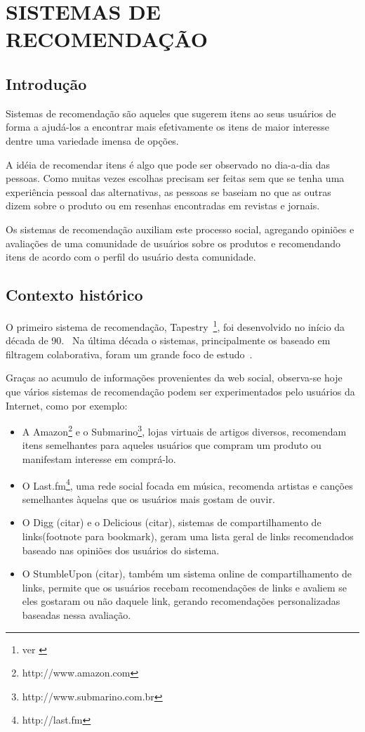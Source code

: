 \chapter{SISTEMAS DE RECOMENDAÇÃO} %
\label{cha:sistemas_de_recomendação}

\section{Introdução}
Sistemas de recomendação são aqueles que sugerem itens ao seus usuários de forma a ajudá-los a encontrar mais efetivamente os itens de maior interesse dentre uma variedade imensa de opções.

A idéia de recomendar itens é algo que pode ser observado no dia-a-dia das pessoas. Como muitas vezes escolhas precisam ser feitas sem que se tenha uma experiência pessoal das alternativas, as pessoas se baseiam no que as outras dizem sobre o produto ou em resenhas encontradas em revistas e jornais.

Os sistemas de recomendação auxiliam este processo social, agregando opiniões e avaliações de uma comunidade de usuários sobre os produtos e recomendando itens de acordo com o perfil do usuário desta comunidade.

\section{Contexto histórico}
O primeiro sistema de recomendação, Tapestry~\footnote{ver \cite{Goldberg92}}, foi desenvolvido no início da década de 90.~\cite{Resnick97} Na última década o sistemas, principalmente os baseado em filtragem colaborativa, foram um grande foco de estudo~\cite{Herlocker04}.

Graças ao acumulo de informações provenientes da web social, observa-se hoje que vários sistemas de recomendação podem ser experimentados pelo usuários da Internet, como por exemplo:

\begin{itemize}
\item 
A Amazon\footnote{http://www.amazon.com} e o Submarino\footnote{http://www.submarino.com.br}, lojas virtuais de artigos diversos, recomendam itens semelhantes para aqueles usuários que compram um produto ou manifestam interesse em comprá-lo.

\item O Last.fm\footnote{http://last.fm}, uma rede social focada em música, recomenda artistas e canções semelhantes àquelas que os usuários mais gostam de ouvir.

\item O Digg (citar) e o Delicious (citar), sistemas de compartilhamento de links(footnote para bookmark), geram uma lista geral de links recomendados baseado nas opiniões dos usuários do sistema.

\item O StumbleUpon (citar), também um sistema online de compartilhamento de links, permite que os usuários recebam recomendações de links e avaliem se eles gostaram ou não daquele link, gerando recomendações personalizadas baseadas nessa avaliação.
\end{itemize}


